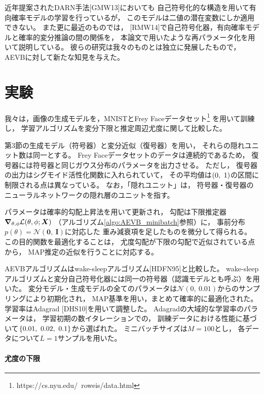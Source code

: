 \documentclass[dvipdfmx, fleqn, draft]{jsarticle}
\begin{document}
近年提案されたDARN手法[GMW13]においても
自己符号化的な構造を用いて有向確率モデルの学習を行っているが，
このモデルは二値の潜在変数にしか適用できない。
また更に最近のものでは，
[RMW14]で自己符号化器，有向確率モデルと確率的変分推論の間の関係を，
本論文で用いたような再パラメータ化を用いて説明している。
彼らの研究は我々のものとは独立に発展したもので，
AEVBに対して新たな知見を与えた。



\section{実験}

我々は，画像の生成モデルを，MNISTとFrey Faceデータセット\footnote{https://cs.nyu.edu/~roweis/data.html}
を用いて訓練し，
学習アルゴリズムを変分下限と推定周辺尤度に関して比較した。

第3節の生成モデル（符号器）と変分近似（復号器）を用い，
それらの隠れユニット数は同一とする。
Frey Faceデータセットのデータは連続的であるため，
復号器には符号器と同じガウス分布のパラメータを出力させる。
ただし，
復号器の出力はシグモイド活性化関数に入れられていて，
その平均値は\(\qty(0,\ 1)\)の区間に制限される点は異なっている。
なお，「隠れユニット」は，
符号器・復号器のニューラルネットワークの隠れ層のユニットを指す。

パラメータは確率的勾配上昇法を用いて更新され，
勾配は下限推定器\(\grad_{\theta, \phi} \mathcal{L}(\theta, \phi; \bm{X})\)%
（アルゴリズム\ref{algo:AEVB_minibatch}参照）に，
事前分布\(p(\theta) = \mathcal{N}(\bm{0},\ \bm{I})\)に対応した
重み減衰項を足したものを微分して得られる。
この目的関数を最適化することは，
尤度勾配が下限の勾配で近似されている点から，
MAP推定の近似を行うことに対応する。

AEVBアルゴリズムはwake-sleepアルゴリズム[HDFN95]と比較した。
wake-sleepアルゴリズムと変分自己符号化器には同一の符号器（認識モデルとも呼ぶ）を用いた。
変分モデル・生成モデルの全てのパラメータは\(\mathcal{N}(0,\ 0.01)\)からのサンプリングにより初期化され，
MAP基準を用い，まとめて確率的に最適化された。
学習率はAdagrad [DHS10]を用いて調整した。
Adagradの大域的な学習率のパラメータは，
学習初期の数イタレーションでの，
訓練データにおける性能に基づいて\(\qty{0.01,\ 0.02,\ 0.1}\)から選ばれた。
ミニバッチサイズは\(M = 100\)とし，
各データについて\(L = 1\)サンプルを用いた。


\paragraph{尤度の下限}
\end{document}
